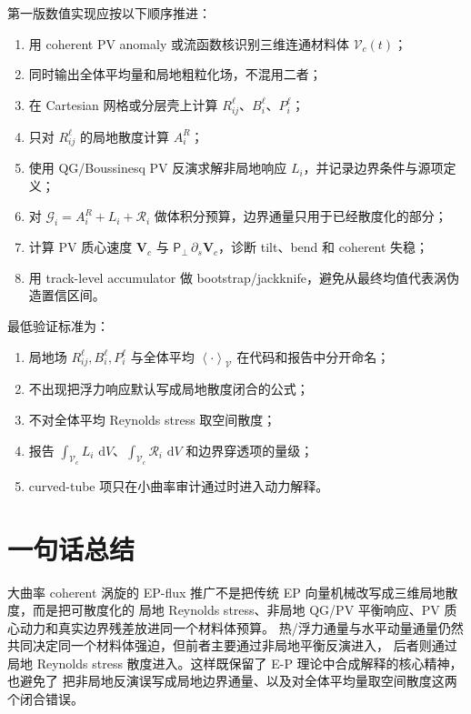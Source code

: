 \documentclass[12pt,a4paper]{ctexart}
\newcommand{\p}{\partial}
\newcommand{\dd}{\,\mathrm d}
\newcommand{\meanV}[1]{\left\langle #1\right\rangle_{\mathcal V}}
\newcommand{\bV}{\boldsymbol V}
\newcommand{\PP}{\boldsymbol{\mathsf P}_{\perp}}
\newcommand{\GG}{\mathcal G}
\newcommand{\RR}{\mathcal R}
\newcommand{\VV}{\mathcal V_c}
\begin{document}
第一版数值实现应按以下顺序推进：
\begin{enumerate}[label=\arabic*.]
  \item 用 coherent PV anomaly 或流函数核识别三维连通材料体 $\VV(t)$；
  \item 同时输出全体平均量和局地粗粒化场，不混用二者；
  \item 在 Cartesian 网格或分层壳上计算 $R_{ij}^{\ell}$、$B_i^{\ell}$、$P_i^{\ell}$；
  \item 只对 $R_{ij}^{\ell}$ 的局地散度计算 $A_i^R$；
  \item 使用 QG/Boussinesq PV 反演求解非局地响应 $L_i$，并记录边界条件与源项定义；
  \item 对 $\GG_i=A_i^R+L_i+\RR_i$ 做体积分预算，边界通量只用于已经散度化的部分；
  \item 计算 PV 质心速度 $\bV_c$ 与 $\PP\,\p_s\bV_c$，诊断 tilt、bend 和 coherent 失稳；
  \item 用 track-level accumulator 做 bootstrap/jackknife，避免从最终均值代表涡伪造置信区间。
\end{enumerate}

最低验证标准为：
\begin{enumerate}[label=\arabic*.]
  \item 局地场 $R_{ij}^{\ell},B_i^{\ell},P_i^{\ell}$ 与全体平均 $\meanV{\cdot}$ 在代码和报告中分开命名；
  \item 不出现把浮力响应默认写成局地散度闭合的公式；
  \item 不对全体平均 Reynolds stress 取空间散度；
  \item 报告 $\int_{\VV}L_i\,\dd V$、$\int_{\VV}\RR_i\,\dd V$ 和边界穿透项的量级；
  \item curved-tube 项只在小曲率审计通过时进入动力解释。
\end{enumerate}

\section{一句话总结}

大曲率 coherent 涡旋的 EP-flux 推广不是把传统 EP 向量机械改写成三维局地散度，而是把可散度化的
局地 Reynolds stress、非局地 QG/PV 平衡响应、PV 质心动力和真实边界残差放进同一个材料体预算。
热/浮力通量与水平动量通量仍然共同决定同一个材料体强迫，但前者主要通过非局地平衡反演进入，
后者则通过局地 Reynolds stress 散度进入。这样既保留了 E-P 理论中合成解释的核心精神，也避免了
把非局地反演误写成局地边界通量、以及对全体平均量取空间散度这两个闭合错误。
\end{document}
